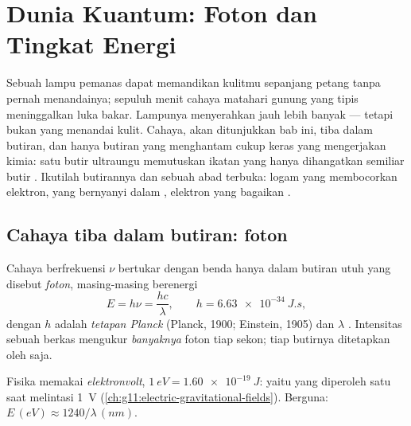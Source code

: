 \chapter{Dunia Kuantum: Foton dan Tingkat Energi}\label{ch:g12:quantum-world}

Sebuah lampu pemanas  dapat memandikan kulitmu sepanjang petang tanpa pernah
menandainya; sepuluh menit cahaya matahari gunung yang tipis meninggalkan luka bakar. Lampunya
menyerahkan jauh lebih banyak  --- tetapi bukan  yang menandai kulit. Cahaya,
akan ditunjukkan bab ini, tiba dalam butiran, dan hanya butiran yang menghantam cukup keras
yang mengerjakan kimia: satu butir ultraungu memutuskan ikatan yang hanya dihangatkan semiliar
butir . Ikutilah butirannya dan sebuah abad terbuka: logam yang membocorkan elektron,
 yang bernyanyi dalam , elektron yang  bagaikan .

\section{Cahaya tiba dalam butiran: foton}

\begin{definition}[Foton]\label{def:g12:quantum-world:photon}
Cahaya berfrekuensi $\nu$ bertukar  dengan benda hanya dalam butiran utuh
yang disebut \emph{foton}, masing-masing berenergi
\[
E = h\nu = \frac{hc}{\lambda}, \qquad h = \qty{6.63e-34}{J.s},
\]
dengan $h$ adalah \emph{tetapan Planck} (Planck,
1900; Einstein, 1905) dan $\lambda$ . Intensitas
sebuah berkas mengukur \emph{banyaknya} foton tiap sekon;  tiap butirnya
ditetapkan oleh  saja.
\end{definition}

\begin{notation}[Elektronvolt]\label{not:g12:quantum-world:ev}
Fisika  memakai \emph{elektronvolt},
$\qty{1}{eV} = \qty{1.60e-19}{J}$: yaitu  yang diperoleh satu 
saat melintasi \qty{1}{V} (\cref{ch:g11:electric-gravitational-fields}). Berguna:
$E \,(\unit{eV}) \approx 1240/\lambda\,(\unit{nm})$.
\end{notation}

